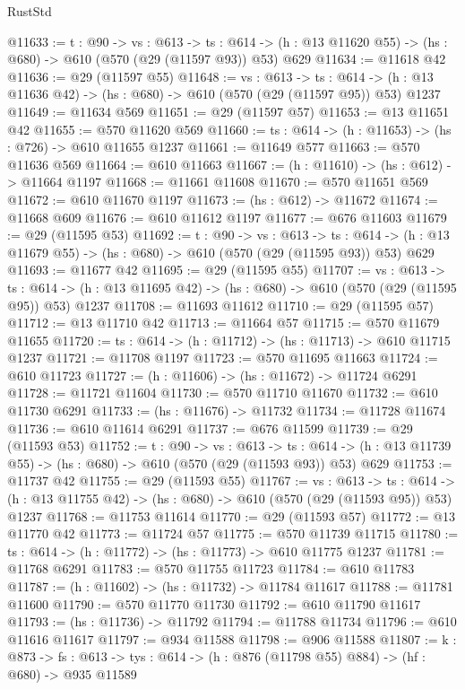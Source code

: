 \begin{lexlean}{RustStd}
\begin{coremodule}
@11633 := {t : @90} ->
  {vs : @613} ->
  {ts : @614} -> (h : @13 @11620 @55) -> (hs : @680) -> @610 (@570 (@29 (@11597 @93)) @53) @629
@11634 := @11618 @42
@11636 := @29 (@11597 @55)
@11648 := {vs : @613} ->
  {ts : @614} -> (h : @13 @11636 @42) -> (hs : @680) -> @610 (@570 (@29 (@11597 @95)) @53) @1237
@11649 := @11634 @569
@11651 := @29 (@11597 @57)
@11653 := @13 @11651 @42
@11655 := @570 @11620 @569
@11660 := {ts : @614} -> (h : @11653) -> (hs : @726) -> @610 @11655 @1237
@11661 := @11649 @577
@11663 := @570 @11636 @569
@11664 := @610 @11663
@11667 := (h : @11610) -> (hs : @612) -> @11664 @1197
@11668 := @11661 @11608
@11670 := @570 @11651 @569
@11672 := @610 @11670 @1197
@11673 := (hs : @612) -> @11672
@11674 := @11668 @609
@11676 := @610 @11612 @1197
@11677 := @676 @11603
@11679 := @29 (@11595 @53)
@11692 := {t : @90} ->
  {vs : @613} ->
  {ts : @614} -> (h : @13 @11679 @55) -> (hs : @680) -> @610 (@570 (@29 (@11595 @93)) @53) @629
@11693 := @11677 @42
@11695 := @29 (@11595 @55)
@11707 := {vs : @613} ->
  {ts : @614} -> (h : @13 @11695 @42) -> (hs : @680) -> @610 (@570 (@29 (@11595 @95)) @53) @1237
@11708 := @11693 @11612
@11710 := @29 (@11595 @57)
@11712 := @13 @11710 @42
@11713 := @11664 @57
@11715 := @570 @11679 @11655
@11720 := {ts : @614} -> (h : @11712) -> (hs : @11713) -> @610 @11715 @1237
@11721 := @11708 @1197
@11723 := @570 @11695 @11663
@11724 := @610 @11723
@11727 := (h : @11606) -> (hs : @11672) -> @11724 @6291
@11728 := @11721 @11604
@11730 := @570 @11710 @11670
@11732 := @610 @11730 @6291
@11733 := (hs : @11676) -> @11732
@11734 := @11728 @11674
@11736 := @610 @11614 @6291
@11737 := @676 @11599
@11739 := @29 (@11593 @53)
@11752 := {t : @90} ->
  {vs : @613} ->
  {ts : @614} -> (h : @13 @11739 @55) -> (hs : @680) -> @610 (@570 (@29 (@11593 @93)) @53) @629
@11753 := @11737 @42
@11755 := @29 (@11593 @55)
@11767 := {vs : @613} ->
  {ts : @614} -> (h : @13 @11755 @42) -> (hs : @680) -> @610 (@570 (@29 (@11593 @95)) @53) @1237
@11768 := @11753 @11614
@11770 := @29 (@11593 @57)
@11772 := @13 @11770 @42
@11773 := @11724 @57
@11775 := @570 @11739 @11715
@11780 := {ts : @614} -> (h : @11772) -> (hs : @11773) -> @610 @11775 @1237
@11781 := @11768 @6291
@11783 := @570 @11755 @11723
@11784 := @610 @11783
@11787 := (h : @11602) -> (hs : @11732) -> @11784 @11617
@11788 := @11781 @11600
@11790 := @570 @11770 @11730
@11792 := @610 @11790 @11617
@11793 := (hs : @11736) -> @11792
@11794 := @11788 @11734
@11796 := @610 @11616 @11617
@11797 := @934 @11588
@11798 := @906 @11588
@11807 := {k : @873} ->
  {fs : @613} -> {tys : @614} -> (h : @876 (@11798 @55) @884) -> (hf : @680) -> @935 @11589

\end{coremodule}
\end{lexlean}
